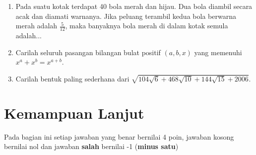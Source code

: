 \documentclass[12pt]{scrartcl}
\begin{document}
\begin{enumerate}
		\item Pada suatu kotak terdapat 40 bola merah dan hijau. Dua bola diambil secara acak dan diamati warnanya. Jika peluang terambil kedua bola berwarna merah adalah $\frac{5}{12}$, maka banyaknya bola merah di dalam kotak semula adalah...
		
		\item Carilah seluruh pasangan bilangan bulat positif $(a,b,x)$ yang memenuhi $x^a+x^b=x^{a+b}$. 
		
		\item Carilah bentuk paling sederhana dari $\sqrt{104\sqrt{6}+468\sqrt{10}+144\sqrt{15}+2006}$.
		
	\end{enumerate}

\section{Kemampuan Lanjut}
Pada bagian ini setiap jawaban yang benar bernilai 4 poin, jawaban kosong bernilai nol
dan jawaban \textbf{salah} bernilai -1 (\textbf{minus satu})
\end{document}
